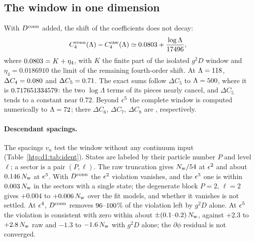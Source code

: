 \subsection{The window in one dimension}\label{htp:d1:sec:window}
With $D^{\rm conn}$ added, the shift of the coefficients does not decay:
\begin{equation}
 C_4^{\rm conn}(\Lambda)-C_4^{\rm raw}(\Lambda)\simeq0.0803+\frac{\log\Lambda}{17496},
 \label{htp:eq:dC4}
\end{equation}
where $0.0803=K+\eta_4$, with $K$ the finite part of the isolated $g^2D$ window and $\eta_4=0.0186910$ the
limit of the remaining fourth-order shift. At $\Lambda=118$, $\Delta C_4=0.080$ and $\Delta
C_5=0.71$. The exact sums follow $\Delta C_5$ to $\Lambda=500$, where it is $0.717651334579$:
the two $\log\Lambda$ terms of its pieces nearly cancel, and $\Delta C_5$ tends to a constant near $0.72$. Beyond
$\epsilon^5$ the complete window is computed numerically to $\Lambda=72$; there $\Delta C_6$, $\Delta C_7$,
$\Delta C_8$ are \NOneDCSeventyTwo, respectively.

\paragraph{Descendant spacings.} The spacings $v_n$ test the window without any continuum input
(Table~\ref{htp:d1:tab:ident}). States are labeled by their particle number $P$ and level $\ell$; a sector is a pair
$(P,\ell)$. The raw truncation gives $N_{\rm w}/54$ at $\epsilon^2$ and about $0.146\,N_{\rm w}$ at $\epsilon^3$. With
$D^{\rm conn}$ the $\epsilon^2$ violation vanishes, and the $\epsilon^3$ one is within $0.003\,N_{\rm w}$ in the
sectors with a single state; the degenerate block $P=2$, $\ell=2$ gives $+0.004$ to $+0.006\,N_{\rm w}$ over the fit
models, and whether it vanishes is not settled. At $\epsilon^4$, $D^{\rm conn}$ removes $96\text{--}100$\% of the violation
left by $g^2D$ alone. At $\epsilon^5$ the violation is consistent with zero within about $\pm(0.1\text{--}0.2)\,N_{\rm w}$,
against $+2.3$ to $+2.8\,N_{\rm w}$ raw and $-1.3$ to $-1.6\,N_{\rm w}$ with $g^2D$ alone; the $\partial\phi$ residual is
not converged.

